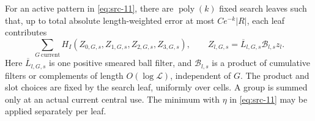 \begin{proposition}
\label{prop:localization}
For an active pattern in \eqref{eq:src-11}, there are
$\operatorname{poly}(k)$ fixed search leaves such that, up to total
absolute length-weighted error at most $Ce^{-k}|R|$, each leaf contributes
\begin{equation*}
 \sum_{G\ \mathrm{current}}
 H_I(Z_{0,G,s},Z_{1,G,s},Z_{2,G,s},Z_{3,G,s}),\qquad
 Z_{l,G,s}=\overline L_{l,G,s}\mathcal B_{l,s}z_l.
 \tag{14}\label{eq:src-14}
\end{equation*}
Here $\overline L_{l,G,s}$ is one positive smeared ball filter, and
$\mathcal B_{l,s}$ is a product of cumulative filters or complements
of length $O(\log\mathcal L)$, independent of $G$.  The product and
slot choices are fixed by the search leaf, uniformly over cells.  A
group is summed only at an actual current central use.  The minimum
with $\eta$ in \eqref{eq:src-11} may be applied separately per leaf.
\end{proposition}

